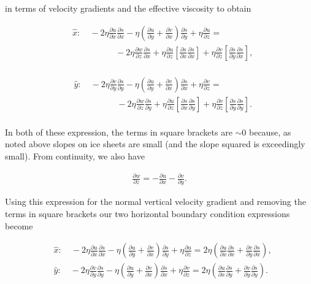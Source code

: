 in terms of velocity gradients and the effective viscosity to obtain

\begin{align*}
   {} & \hat{x}:\quad -2\eta \frac{\partial u}{\partial x}\frac{\partial s}{\partial x}-\eta \left( \frac{\partial u}{\partial y}+\frac{\partial v}{\partial x} \right)\frac{\partial s}{\partial y}+\eta \frac{\partial u}{\partial z}=  \\
   {} & \quad \quad \quad \quad \quad -2\eta \frac{\partial w}{\partial z}\frac{\partial s}{\partial x}+\eta \frac{\partial u}{\partial z}\left[ \frac{\partial s}{\partial x}\frac{\partial s}{\partial x} \right]+\eta \frac{\partial v}{\partial z}\left[ \frac{\partial s}{\partial y}\frac{\partial s}{\partial x} \right],  \\
\end{align*}

\begin{align*}
   {} & \hat{y}:\quad -2\eta \frac{\partial v}{\partial y}\frac{\partial s}{\partial y}-\eta \left( \frac{\partial u}{\partial y}+\frac{\partial v}{\partial x} \right)\frac{\partial s}{\partial x}+\eta \frac{\partial v}{\partial z}=  \\
   {} & \quad \quad \quad \quad \quad -2\eta \frac{\partial w}{\partial z}\frac{\partial s}{\partial y}+\eta \frac{\partial u}{\partial z}\left[ \frac{\partial s}{\partial x}\frac{\partial s}{\partial y} \right]+\eta \frac{\partial v}{\partial z}\left[ \frac{\partial s}{\partial y}\frac{\partial s}{\partial y} \right].  \\
\end{align*}

In both of these expression, the terms in square brackets are $\sim{0}$ because, as noted above slopes on ice sheets are small (and the slope squared is exceedingly small). From continuity, we also have

\begin{align*}
\frac{\partial w}{\partial z}=-\frac{\partial u}{\partial x}-\frac{\partial v}{\partial y}.
\end{align*}

Using this expression for the normal vertical velocity gradient and removing the terms in square brackets our two horizontal boundary condition expressions become

\begin{align*}
   {} & \hat{x}:\quad -2\eta \frac{\partial u}{\partial x}\frac{\partial s}{\partial x}-\eta \left( \frac{\partial u}{\partial y}+\frac{\partial v}{\partial x} \right)\frac{\partial s}{\partial y}+\eta \frac{\partial u}{\partial z}=2\eta \left( \frac{\partial u}{\partial x}\frac{\partial s}{\partial x}+\frac{\partial v}{\partial y}\frac{\partial s}{\partial x} \right),  \\
   {} & \hat{y}:\quad -2\eta \frac{\partial v}{\partial y}\frac{\partial s}{\partial y}-\eta \left( \frac{\partial u}{\partial y}+\frac{\partial v}{\partial x} \right)\frac{\partial s}{\partial x}+\eta \frac{\partial v}{\partial z}=2\eta \left( \frac{\partial u}{\partial x}\frac{\partial s}{\partial y}+\frac{\partial v}{\partial y}\frac{\partial s}{\partial y} \right).  \\
\end{align*}

